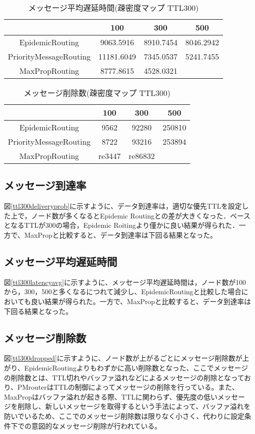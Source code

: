 \documentclass[11pt]{icsthesis}
\begin{document}
\begin{table}[H]
 \begin{center}
      \caption[]{メッセージ平均遅延時間(疎密度マップ TTL300)}
      \label{somituTtl300latencyavg}
      \begin{tabular}{|c|c|c|c|}
\hline
&100&300&500\\
\hline
EpidemicRouting&9063.5916&8910.7454&8046.2942\\
\hline
PriorityMessageRouting&11181.6049&7345.0537&5241.7455\\
\hline
MaxPropRouting&8777.8615&4528.0321
&\\
\hline
      \end{tabular}
    \end{center}
\end{table}

\begin{table}[H]
 \begin{center}
      \caption[]{メッセージ削除数(疎密度マップ TTL300)}
      \label{somituTtl300dropped}
      \begin{tabular}{|c|c|c|c|}
\hline
&100&300&500\\
\hline
EpidemicRouting&9562&92280 &250810\\
\hline
PriorityMessageRouting&8722&93216&253894\\
\hline
MaxPropRouting&re3447&re86832&\\
\hline
      \end{tabular}
    \end{center}
\end{table}
\subsection{メッセージ到達率}
図\ref{ttl300deliveryprob}に示すように、データ到達率は，適切な優先TTLを設定した上で，ノード数が多くなるとEpidemic Routingとの差が大きくなった．ベースとなるTTLが300の場合，Epidemic Roitingより僅かに良い結果が得られた．一方で、MaxPropと比較すると、データ到達率は下回る結果となった。
\subsection{メッセージ平均遅延時間}
図\ref{ttl300latencyavg}に示すように、メッセージ平均遅延時間は，ノード数が100から，300，500と多くなるにつれて減少し、EpidemicRoutingと比較した場合においても良い結果が得られた。一方で、MaxPropと比較すると、データ到達率は下回る結果となった。
\subsection{メッセージ削除数}
図\ref{ttl300dropped}に示すように、ノード数が上がるごとにメッセージ削除数が上がり、EpidemicRoutingよりもわずかに高い削除数となった、ここでメッセージの削除数とは、TTL切れやバッファ溢れなどによるメッセージの削除となっており、PMrouterはTTLの制御によってメッセージの削除を行っている。また、MaxPropはバッファ溢れが起きる際、TTLに関わらず、優先度の低いメッセージを削除し、新しいメッセージを取得するという手法によって、バッファ溢れを防いでいるため、ここでのメッセージ削除数は限りなく小さく、代わりに設定条件下での意図的なメッセージ削除が行われている。
\end{document}
